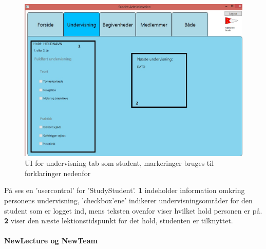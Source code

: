 \begin{figure}[htbp]
  \centering
  \includegraphics[width=1\textwidth]{images/UI/StudyStudentMarked.jpg}
  \caption[UIStudyStudent]{UI for undervisning tab som student, markeringer bruges til forklaringer nedenfor}
  \label{fig:StudyStudent}
\end{figure}

På  ses en 'usercontrol' for 'StudyStudent'. \textbf{1} indeholder information omkring personens undervisning, 'checkbox'ene' indikerer undervisningsområder for den student som er logget ind, mens teksten ovenfor viser hvilket hold personen er på. \textbf{2} viser den næste lektionstidspunkt for det hold, studenten er tilknyttet.

\paragraph{NewLecture og NewTeam}

